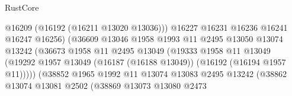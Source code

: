 \begin{lexlean}{RustCore}
\begin{coremodule}
                                                @16209
                                                (@16192 (@16211 @13020 @13036)))
                                              @16227
                                              @16231
                                              @16236
                                              @16241
                                              @16247
                                              @16256)
                                            (@36609
                                              @13046
                                              @1958
                                              @1993
                                              @11
                                              @2495
                                              @13050
                                              @13074
                                              @13242
                                              (@36673
                                                @1958
                                                @11
                                                @2495
                                                @13049
                                                (@19333
                                                  @1958
                                                  @11
                                                  @13049
                                                  (@19292
                                                    @1957
                                                    @13049
                                                    (@16187 (@16188 @13049))
                                                    (@16192 (@16194 @1957 @11)))))
                                              (@38852
                                                @1965
                                                @1992
                                                @11
                                                @13074
                                                @13083
                                                @2495
                                                @13242
                                                (@38862
                                                  @13074
                                                  @13081
                                                  @2502
                                                  (@38869
                                                    @13073
                                                    @13080
                                                    @2473

\end{coremodule}
\end{lexlean}

